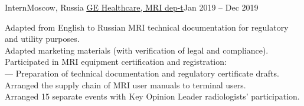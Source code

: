     \resumeSubheading
      {Intern}{Moscow, Russia}
      {\href{https://www.gehealthcare.ru/products/magnetic-resonance-imaging}{\underline{GE Healthcare, MRI dep-t}}}{Jan 2019 -- Dec 2019}
      \begin{itemize}[leftmargin=0in, label={}]
            \small{\item{
                {Adapted from English to Russian MRI technical documentation for regulatory and utility purposes.}\\
                {Adapted marketing materials (with verification of legal and compliance).}\\
                {Participated in MRI equipment certification and registration:}\\
                {— Preparation of technical documentation and regulatory certificate drafts.}\\
                {Arranged the supply chain of MRI user manuals to terminal users.}\\
                {Arranged 15 separate events with Key Opinion Leader radiologists' participation.}
            }}
      \end{itemize}